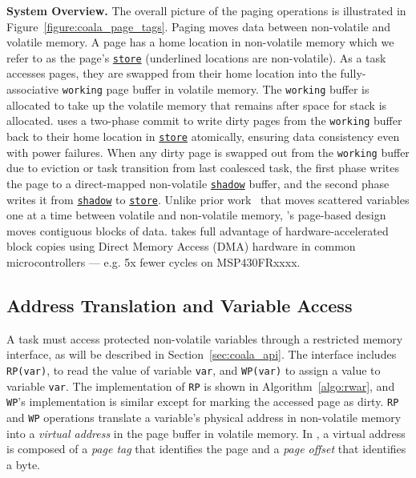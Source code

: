 \textbf{System Overview.} The overall picture of the paging operations is illustrated in Figure~\ref{figure:coala_page_tags}. Paging moves data between non-volatile and volatile memory. A page has a home location in non-volatile memory which we refer to as the page's \texttt{\underline{store}} (underlined locations are non-volatile).
As a task accesses pages, they are swapped from their home location
into the fully\hyp{}associative \texttt{working} page buffer in volatile memory. The \texttt{working} buffer is allocated to take up the volatile memory that remains after space for stack is allocated.
%
\sys uses a two-phase commit to write dirty pages from the \texttt{working} buffer back to their home location in \texttt{\underline{store}} atomically, ensuring data consistency even with power failures.
%
When any dirty page is swapped out from the \texttt{working} buffer due to eviction or task transition from last coalesced task, the first phase writes the page to a direct\hyp{}mapped non-volatile \texttt{\underline{shadow}} buffer, and the second phase writes it from \texttt{\underline{shadow}} to \texttt{\underline{store}}.
%
Unlike prior work~\cite{chain,alpaca} that moves scattered variables one at a time between volatile and non-volatile memory, \sys's page-based design moves contiguous blocks of data.
%
\sys takes full advantage of hardware\hyp{}accelerated block copies using Direct Memory Access (DMA) hardware in common microcontrollers --- e.g. 5x fewer cycles on MSP430FRxxxx.

\subsection{Address Translation and Variable Access}

A \sys task must access protected non-volatile variables through a restricted memory interface, as will be described in Section~\ref{sec:coala_api}. The interface includes \texttt{RP(var)}, to read the value of variable {\tt var}, and \texttt{WP(var)} to assign a value to variable {\tt var}. The implementation of {\tt RP} is shown in Algorithm~\ref{algo:rwar}, and {\tt WP}'s implementation is similar except for marking the accessed page as dirty.
%
{\tt RP} and {\tt WP} operations translate a variable's physical address in non-volatile memory into a \emph{virtual address} in the page buffer in volatile memory. In \sys, a virtual address is composed of a \emph{page tag} that identifies the page and a \emph{page offset} that identifies a byte.


